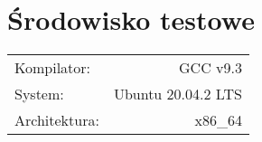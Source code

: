 \section{Środowisko testowe}\label{sec:environment}
\begin{tabular}{l r}
  Kompilator:   & GCC v9.3\\
  System:       & Ubuntu 20.04.2 LTS\\
  Architektura: & x86\_64
\end{tabular}
